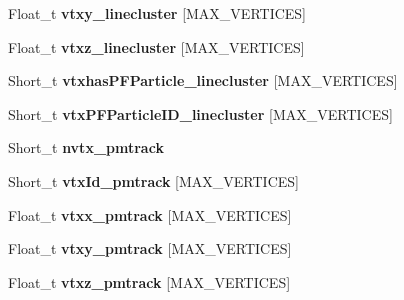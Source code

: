 \begin{DoxyCompactItemize}
\item 
\hypertarget{classanatree_aa533a7342c56e573951125ec11daeb13}{Float\-\_\-t {\bfseries vtxy\-\_\-linecluster} \mbox{[}M\-A\-X\-\_\-\-V\-E\-R\-T\-I\-C\-E\-S\mbox{]}}\label{classanatree_aa533a7342c56e573951125ec11daeb13}

\item 
\hypertarget{classanatree_ac30b6e15a59a3f9196f6dd657e56c373}{Float\-\_\-t {\bfseries vtxz\-\_\-linecluster} \mbox{[}M\-A\-X\-\_\-\-V\-E\-R\-T\-I\-C\-E\-S\mbox{]}}\label{classanatree_ac30b6e15a59a3f9196f6dd657e56c373}

\item 
\hypertarget{classanatree_a8b34d2e986cff37efa6366b6fac906aa}{Short\-\_\-t {\bfseries vtxhas\-P\-F\-Particle\-\_\-linecluster} \mbox{[}M\-A\-X\-\_\-\-V\-E\-R\-T\-I\-C\-E\-S\mbox{]}}\label{classanatree_a8b34d2e986cff37efa6366b6fac906aa}

\item 
\hypertarget{classanatree_a657fe1e33d56c77e99419c64c36df3e9}{Short\-\_\-t {\bfseries vtx\-P\-F\-Particle\-I\-D\-\_\-linecluster} \mbox{[}M\-A\-X\-\_\-\-V\-E\-R\-T\-I\-C\-E\-S\mbox{]}}\label{classanatree_a657fe1e33d56c77e99419c64c36df3e9}

\item 
\hypertarget{classanatree_aea614ee837b25918997ef74cd606f47e}{Short\-\_\-t {\bfseries nvtx\-\_\-pmtrack}}\label{classanatree_aea614ee837b25918997ef74cd606f47e}

\item 
\hypertarget{classanatree_ac4dbad19aa6ecea4cd20fc7853e57dad}{Short\-\_\-t {\bfseries vtx\-Id\-\_\-pmtrack} \mbox{[}M\-A\-X\-\_\-\-V\-E\-R\-T\-I\-C\-E\-S\mbox{]}}\label{classanatree_ac4dbad19aa6ecea4cd20fc7853e57dad}

\item 
\hypertarget{classanatree_abdcd02d6a678ed35fd1cd7813e37e073}{Float\-\_\-t {\bfseries vtxx\-\_\-pmtrack} \mbox{[}M\-A\-X\-\_\-\-V\-E\-R\-T\-I\-C\-E\-S\mbox{]}}\label{classanatree_abdcd02d6a678ed35fd1cd7813e37e073}

\item 
\hypertarget{classanatree_ad78994567ecddbe0480f7bc23724981c}{Float\-\_\-t {\bfseries vtxy\-\_\-pmtrack} \mbox{[}M\-A\-X\-\_\-\-V\-E\-R\-T\-I\-C\-E\-S\mbox{]}}\label{classanatree_ad78994567ecddbe0480f7bc23724981c}

\item 
\hypertarget{classanatree_a7e5de17f424482581b756ef1d657d981}{Float\-\_\-t {\bfseries vtxz\-\_\-pmtrack} \mbox{[}M\-A\-X\-\_\-\-V\-E\-R\-T\-I\-C\-E\-S\mbox{]}}\label{classanatree_a7e5de17f424482581b756ef1d657d981}


\end{DoxyCompactItemize}
